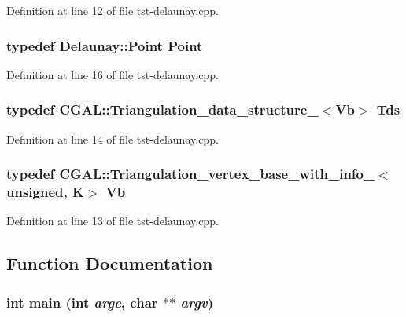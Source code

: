 Definition at line 12 of file tst-\/delaunay.cpp.

\hypertarget{tst-delaunay_8cpp_aa5acf70a1c48c8f9446423f5522abeb8}{
\subsubsection[{Point}]{\setlength{\rightskip}{0pt plus 5cm}typedef {\bf Delaunay::Point} {\bf Point}}}
\label{tst-delaunay_8cpp_aa5acf70a1c48c8f9446423f5522abeb8}


Definition at line 16 of file tst-\/delaunay.cpp.

\hypertarget{tst-delaunay_8cpp_a2c94e68b962973b8c8da8aa0fa8f7a47}{
\subsubsection[{Tds}]{\setlength{\rightskip}{0pt plus 5cm}typedef CGAL::Triangulation\_\-data\_\-structure\_$<${\bf Vb}$>$ {\bf Tds}}}
\label{tst-delaunay_8cpp_a2c94e68b962973b8c8da8aa0fa8f7a47}


Definition at line 14 of file tst-\/delaunay.cpp.

\hypertarget{tst-delaunay_8cpp_a3bf8a2b64134355d805171df5dc05101}{
\subsubsection[{Vb}]{\setlength{\rightskip}{0pt plus 5cm}typedef CGAL::Triangulation\_\-vertex\_\-base\_\-with\_\-info\_$<$unsigned, {\bf K}$>$ {\bf Vb}}}
\label{tst-delaunay_8cpp_a3bf8a2b64134355d805171df5dc05101}


Definition at line 13 of file tst-\/delaunay.cpp.



\subsection{Function Documentation}
\hypertarget{tst-delaunay_8cpp_a3c04138a5bfe5d72780bb7e82a18e627}{
\subsubsection[{main}]{\setlength{\rightskip}{0pt plus 5cm}int main (int {\em argc}, \/  char $\ast$$\ast$ {\em argv})}}
\label{tst-delaunay_8cpp_a3c04138a5bfe5d72780bb7e82a18e627}


